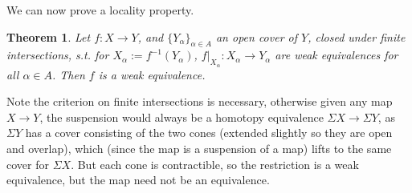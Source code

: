 \documentclass{article}
\newtheorem{theorem}{Theorem}[section]
\newtheorem{proposed work}[theorem]{Proposed Work}
\theoremstyle{definition}
\begin{document}
We can now prove a locality property.
\begin{theorem} \label{Thm:LocalWeak}
Let $f:X\to Y$, and $\{Y_\alpha\}_{\alpha \in A}$ an open cover of $Y$, closed under finite intersections, s.t. for $X_\alpha:=f^{-1}(Y_\alpha)$, $f|_{X_\alpha}: X_{\alpha} \to Y_{\alpha}$ are weak equivalences for all $\alpha \in A$. Then $f$ is a weak equivalence.
\end{theorem}

Note the criterion on finite intersections is necessary, otherwise given any map $X\to Y$, the suspension would always be a homotopy equivalence $\Sigma X \to \Sigma Y$, as $\Sigma Y$ has a cover consisting of the two cones (extended slightly so they are open and overlap), which (since the map is a suspension of a map) lifts to the same cover for $\Sigma X$. But each cone is contractible, so the restriction is a weak equivalence, but the map need not be an equivalence.
\end{document}
